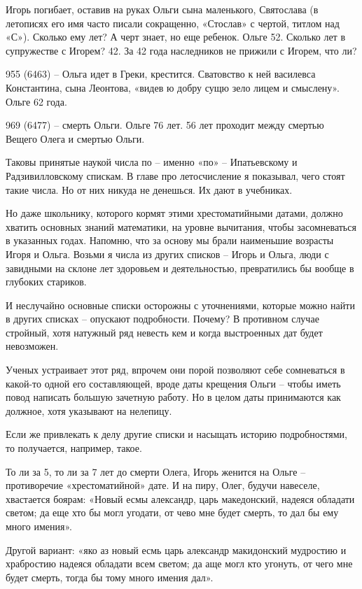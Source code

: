 Игорь погибает, оставив на руках Ольги сына маленького, Святослава (в летописях его имя часто писали сокращенно, «Стослав» с чертой, титлом над «С»). Сколько ему лет? А черт знает, но еще ребенок. Ольге 52. Сколько лет в супружестве с Игорем? 42. За 42 года наследников не прижили с Игорем, что ли?

955 (6463) – Ольга идет в Греки, крестится. Сватовство к ней василевса Константина, сына Леонтова, «видев ю добру сущю зело лицем и смыслену». Ольге 62 года.

969 (6477) – смерть Ольги. Ольге 76 лет. 56 лет проходит между смертью Вещего Олега и смертью Ольги.

Таковы принятые наукой числа по – именно «по» – Ипатьевскому и Радзивилловскому спискам. В главе про летосчисление я показывал, чего стоят такие числа. Но от них никуда не денешься. Их дают в учебниках.

Но даже школьнику, которого кормят этими хрестоматийными датами, должно хватить основных знаний математики, на уровне вычитания, чтобы засомневаться в указанных годах. Напомню, что за основу мы брали наименьшие возрасты Игоря и Ольга. Возьми я числа из других списков – Игорь и Ольга, люди с завидными на склоне лет здоровьем и деятельностью, превратились бы вообще в глубоких стариков.

И неслучайно основные списки осторожны с уточнениями, которые можно найти в других списках – опускают подробности. Почему? В противном случае стройный, хотя натужный ряд невесть кем и когда выстроенных дат будет  невозможен.

Ученых устраивает этот ряд, впрочем они порой позволяют себе сомневаться в какой-то одной его составляющей, вроде даты крещения Ольги – чтобы иметь повод написать большую зачетную работу. Но в целом даты принимаются как должное, хотя указывают на нелепицу.

Если же привлекать к делу другие списки и насыщать историю подробностями, то получается, например, такое.

То ли за 5, то ли за 7 лет до смерти Олега, Игорь женится на Ольге – противоречие «хрестоматийной» дате. И на пиру, Олег, будучи навеселе, хвастается боярам: «Новый есмы александр, царь македонский, надеяся обладати светом; да еще хто бы могл угодати, от чево мне будет смерть, то дал бы ему много имения».

Другой вариант: «яко аз новый есмь царь александр макидонский мудростию и храбростию надеяся обладати всем светом; да аще могл кто угонуть, от чего мне будет смерть, тогда бы тому много имения дал». 

